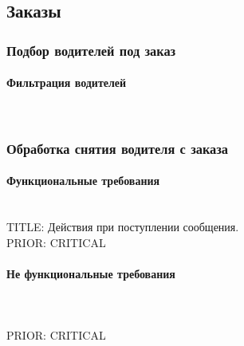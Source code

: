 \subsection{Заказы}

  \subsubsection{Подбор водителей под заказ} \label{selection_drivers_for_the_order}

    \paragraph{Фильтрация водителей} \mbox{} \\ \label{driver_filters_taxi_service}

  \subsubsection{Обработка снятия водителя с заказа} \label{remove_driver_from_order}

    \paragraph{Функциональные требования} \mbox{}\\

      TITLE: Действия при поступлении сообщения.
     	\\
      PRIOR: CRITICAL\\

    \paragraph{Не функциональные требования} \mbox{}\\

      \\
      PRIOR: CRITICAL\\


